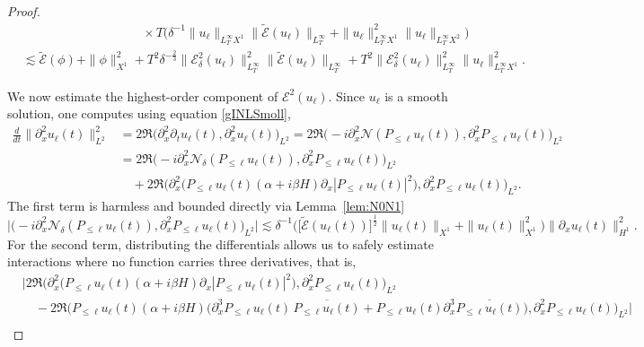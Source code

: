 \documentclass[10pt,a4paper]{amsart}
\begin{document}
\begin{proof}
\begin{equation}
\begin{aligned}
&\hspace{4cm} \times T\Big( \delta^{-1}\| u_\ell \|_{L^\infty_TX^1}\| \widetilde{\mathcal{E}}(u_\ell)\|_{L^\infty_T}+\| u_\ell \|_{L^\infty_TX^1}^2\| u_\ell \|_{L^\infty_TX^2}\Big) \\
&\lesssim \widetilde{\mathcal{E}}(\phi)+\| \phi \|_{X^1}^2+ T^2\delta^{-\frac23}\| \mathcal{E}^2_\delta(u_\ell) \|_{L^\infty_T}^2\| \widetilde{\mathcal{E}}(u_\ell) \|_{L^\infty_T} +T^2\| \mathcal{E}^2_\delta(u_\ell) \|_{L^\infty_T}^2\| u_\ell \|_{L^\infty_TX^1}^2.
\end{aligned}
\end{equation}

We now estimate the highest-order component of $\mathcal{E}^2(u_\ell)$. Since $u_\ell$ is a smooth solution, one computes using equation \eqref{gINLSmoll},
$$\begin{aligned}
\frac{d}{dt}\| \partial_x^2u_\ell(t) \|_{L^2}^2 &= 2\Re \big( \partial_x^2\partial_t u_\ell(t),\partial_x^2u_\ell(t)\big)_{L^2} = 2\Re \big( {-}i \partial_x^2\mathcal{N}(P_{\leq \ell}u_\ell(t)),\partial_x^2P_{\leq \ell}u_\ell(t)\big)_{L^2}  \\
&= 2\Re \big( {-}i\partial_x^2\mathcal{N}_\delta(P_{\leq \ell}u_\ell(t)) ,\partial_x^2P_{\leq \ell}u_\ell(t)\big)_{L^2} \\
&\quad + 2\Re \big( \partial_x^2\big( P_{\leq \ell}u_\ell(t)(\alpha +i\beta H)\partial_x |P_{\leq \ell}u_\ell(t)|^2\big) ,\partial_x^2P_{\leq \ell}u_\ell(t)\big)_{L^2}.
\end{aligned} $$
The first term is harmless and bounded directly via Lemma~\ref{lem:N0N1}
$$\Big| \big( {-}i\partial_x^2\mathcal{N}_\delta(P_{\leq \ell}u_\ell(t)) ,\partial_x^2P_{\leq \ell}u_\ell(t)\big)_{L^2} \Big| \lesssim \delta^{-1} \Big( \big[ \widetilde{\mathcal{E}}(u_\ell(t))\big] ^{\frac12}\|u_\ell(t)\|_{X^1}+\| u_\ell(t) \|_{X^1}^2\Big) \| \partial_xu_\ell(t) \|_{H^1}^2. $$
For the second term, distributing the differentials allows us to safely estimate interactions where no function carries three derivatives, that is,
$$\begin{aligned}
&\Big| 2\Re \big( \partial_x^2\big( P_{\leq \ell}u_\ell(t)(\alpha +i\beta H)\partial_x |P_{\leq \ell}u_\ell(t)|^2\big) ,\partial_x^2P_{\leq \ell}u_\ell(t)\big)_{L^2} \\
&\quad -2\Re \big( P_{\leq \ell}u_\ell(t)(\alpha +i\beta H)\big(\partial_x^3P_{\leq \ell}u_\ell(t)\,\overline{P_{\leq \ell}u_\ell(t)}+P_{\leq \ell}u_\ell(t)\partial_x^3\overline{P_{\leq \ell}u_\ell(t)}\big) ,\partial_x^2P_{\leq \ell}u_\ell(t)\big)_{L^2} \Big| \\

\end{aligned}$$
\end{proof}
\end{document}

